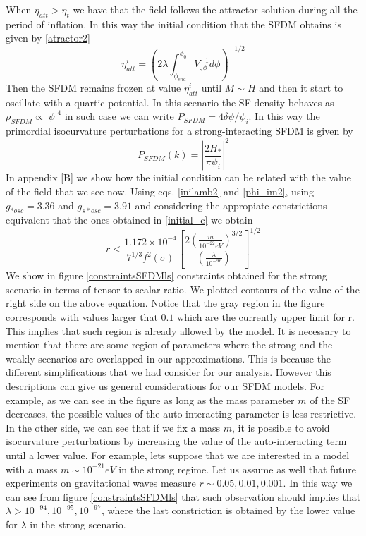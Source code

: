 \documentclass[amssymb,twocolumn,prd,nofootinbib,showpacs]{revtex4-1}
\begin{document}
When $\eta_{att}>\eta_t$ we have that the field follows the attractor solution during all the period of inflation. In this way the initial condition that the SFDM obtains is given by \eqref{atractor2}
\begin{equation}\label{atractor3}
\eta_{att}^i = \left(2\lambda\int_{\phi_{end}}^{\phi_0}V^{-1}_{,\phi}d\phi\right)^{-1/2}
\end{equation}
Then the SFDM remains frozen at value $\eta_{att}^i$ until $M\sim H$ and then it start to oscillate with a quartic potential. In this scenario the SF density behaves as $\rho_{SFDM}\propto |\psi|^4$ in such case we can write $P_{SFDM}=4\delta\psi/\psi_i$. In this way the primordial isocurvature perturbations for a strong-interacting SFDM is given by
\begin{equation}
P_{SFDM}(k)=\left|\frac{2H_*}{\pi\psi_i}\right|^2
\end{equation}
In appendix [B] we show how the initial condition can be related with the value of the field that we see now. Using eqs. \eqref{inilamb2} and \eqref{phi_im2}, using $g_{*osc}=3.36$ and $g_{s*osc}=3.91$  and considering the appropiate constrictions equivalent that the ones obtained in \eqref{initial_c} we obtain
\begin{equation}\label{constr4}
r<\frac{1.172\times 10^{-4}}{7^{1/3}f^2(\sigma)}\left[\frac{2\left(\frac{m}{10^{-22}eV}\right)^{3/2}}{\left(\frac{\lambda}{10^{-96}}\right)}\right]^{1/2}
\end{equation}
We show in figure \ref{constraintsSFDMls} constraints obtained for the strong scenario in terms of tensor-to-scalar ratio. We plotted contours of the value of the right side on the above equation. Notice that the gray region in the figure corresponds with values larger that $0.1$ which are the currently upper limit for r. This implies that such region is already allowed by the model. It is necessary to mention that there are some region of parameters where the strong and the weakly scenarios are overlapped in our approximations. This is because the different simplifications that we had consider for our analysis. However this descriptions can give us general considerations for our SFDM models. For example, as we can see in the figure as long as the mass parameter $m$ of the SF decreases, the possible values of the auto-interacting parameter is less restrictive. In the other side, we can see that if we fix a mass $m$, it is possible to avoid isocurvature perturbations by increasing the value of the auto-interacting term until a lower value. For example, lets suppose that we are interested in a model with a mass $m\sim 10^{-21} eV$ in the strong regime. Let us assume as well that future experiments on gravitational waves measure $r\sim 0.05,0.01,0.001$. In this way we can see from figure \ref{constraintsSFDMls} that such observation should implies that $\lambda>10^{-94},10^{-95},10^{-97}$, where the last constriction is obtained by the lower value for $\lambda$ in the strong scenario.   
\end{document}
